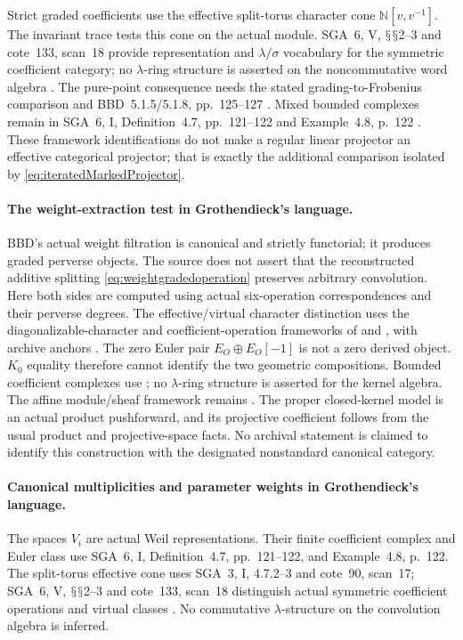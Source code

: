 \documentclass[11pt,a4paper]{article}
\renewcommand{\S}{\ensuremath{\mathsection}}
\theoremstyle{named}\newtheorem{finding}{Finding}[section]
\theoremstyle{definition}\newtheorem{definition}[finding]{Definition}
\theoremstyle{remark}\newtheorem{remark}[finding]{Remark}
\begin{document}
Strict graded coefficients use the effective split-torus
character cone \(\mathbb N[v,v^{-1}]\).
The invariant trace tests this cone on the actual module.
SGA~6, V, \S\S2--3 and cote~133, scan~18 provide
representation and \(\lambda/\sigma\) vocabulary for
the symmetric coefficient category; no \(\lambda\)-ring
structure is asserted on the noncommutative word algebra
\cite{SGA6,Archive}.
The pure-point consequence needs the stated
grading-to-Frobenius comparison and BBD~5.1.5/5.1.8,
pp.~125--127 \cite{BBD}.
Mixed bounded complexes remain in SGA~6, I,
Definition~4.7, pp.~121--122 and Example~4.8,
p.~122 \cite{SGA6}.
These framework identifications do not make a regular
linear projector an effective categorical projector;
that is exactly the additional comparison isolated by
\eqref{eq:iteratedMarkedProjector}.

\paragraph{The weight-extraction test in Grothendieck's language.}
BBD's actual weight filtration is canonical and strictly
functorial; it produces graded perverse objects. The source
does not assert that the reconstructed additive splitting
\eqref{eq:weightgradedoperation} preserves arbitrary
convolution. Here both sides are computed using actual
six-operation correspondences and their perverse degrees.
The effective/virtual character distinction uses the
diagonalizable-character and coefficient-operation
frameworks of \cite[Expos\'e~I, 4.7.2--3]{SGA3} and
\cite[Expos\'e~V, \S\S2--3]{SGA6}, with archive anchors
\cite[cote~90, scan~17; cote~133, scan~18]{Archive}.
The zero Euler pair \(E_O\oplus E_O[-1]\) is not a zero
derived object. \(K_0\) equality therefore cannot identify
the two geometric compositions. Bounded coefficient
complexes use \cite[Expos\'e~I, Definition~4.7,
pp.~121--122, and Example~4.8, p.~122]{SGA6}; no
\(\lambda\)-ring structure is asserted for the kernel algebra.
The affine module/sheaf framework remains
\cite[Theorem~1.3.7, p.~86; Corollary~1.3.8, p.~87;
Theorem~1.4.1, pp.~90--92]{EGA}. The proper closed-kernel
model is an actual product pushforward, and its projective
coefficient follows from the usual product and
projective-space facts. No archival statement is claimed
to identify this construction with the designated
nonstandard canonical category.

\paragraph{Canonical multiplicities and parameter weights in Grothendieck's language.}
The spaces \(V_i\) are actual Weil representations.
Their finite coefficient complex and Euler class use
SGA~6, I, Definition~4.7, pp.~121--122, and
Example~4.8, p.~122. The split-torus effective cone
uses SGA~3, I, 4.7.2--3 and cote~90, scan~17;
SGA~6, V, \S\S2--3 and cote~133, scan~18 distinguish
actual symmetric coefficient operations and virtual
classes \cite{SGA3,SGA6,Archive}.
No commutative \(\lambda\)-structure on the convolution
algebra is inferred.
\end{document}

